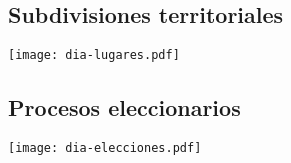 \documentclass[letterpaper,titlepage]{article}
\begin{document}
\subsection{Subdivisiones territoriales}
\begin{center}
  \texttt{[image: dia-lugares.pdf]}
\end{center}

\subsection{Procesos eleccionarios}
\begin{center}
  \texttt{[image: dia-elecciones.pdf]}
\end{center}
\end{document}
